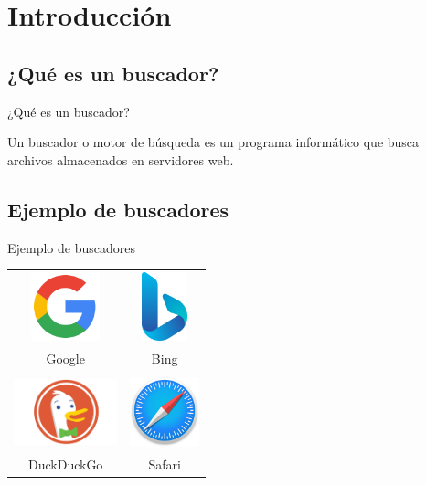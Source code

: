 \section{Introducción}\label{sec:intro}

\subsection{¿Qué es un buscador?}
\begin{frame}{¿Qué es un buscador?}
    \begin{center}
        Un buscador o motor de búsqueda es un programa informático que busca archivos almacenados en servidores web.
    \end{center}
\end{frame}

\subsection{Ejemplo de buscadores}
\begin{frame}{Ejemplo de buscadores}
    \begin{center}
        \begin{tabular}{c c}
            \includegraphics[width=2cm]{fotos/google.png} & \includegraphics[width=2cm, height=2cm]{fotos/bing.png} \\
            Google &  Bing \\ \\
            \includegraphics[width=3cm]{fotos/DuckDuckGo.png} & \includegraphics[width=2cm]{fotos/safari.png} \\
            DuckDuckGo  & Safari \\
        \end{tabular}
    \end{center}
\end{frame}

